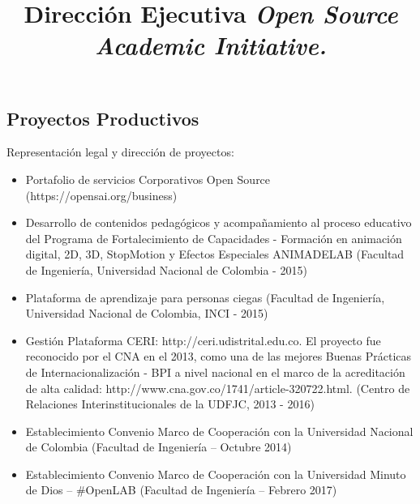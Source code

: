 \documentclass[overlapped,line,final]{res}
\begin{document}
\begin{resume}
\vspace{0.5cm}
\section{\sc Proyectos Productivos } %
\vspace{0.5cm}
\title{\bf Dirección Ejecutiva
	\newline \em Open Source Academic Initiative.
}
\begin{position}
Representación legal y dirección de proyectos:
\begin{itemize}
\item Portafolio de servicios Corporativos Open Source (https://opensai.org/business)
\item Desarrollo de contenidos pedagógicos y acompañamiento al proceso educativo del Programa de Fortalecimiento de Capacidades - Formación en animación digital, 2D, 3D, StopMotion y Efectos Especiales ANIMADELAB (Facultad de Ingeniería, Universidad Nacional de Colombia - 2015)
\item Plataforma de aprendizaje para personas ciegas (Facultad de Ingeniería, Universidad Nacional de Colombia, INCI - 2015)
\item Gestión Plataforma CERI: http://ceri.udistrital.edu.co. El proyecto fue reconocido por el CNA en el 2013, como una de las mejores Buenas Prácticas de Internacionalización - BPI a nivel nacional en el marco de la acreditación de alta calidad: http://www.cna.gov.co/1741/article-320722.html. (Centro de Relaciones Interinstitucionales de la UDFJC,  2013 - 2016)
\item Establecimiento Convenio Marco de Cooperación con la Universidad Nacional de Colombia (Facultad de Ingeniería – Octubre 2014)
\item Establecimiento Convenio Marco de Cooperación con la Universidad Minuto de Dios – \#OpenLAB (Facultad de Ingeniería – Febrero 2017)
\end{itemize}

\end{position}


\end{resume}
\end{document}
